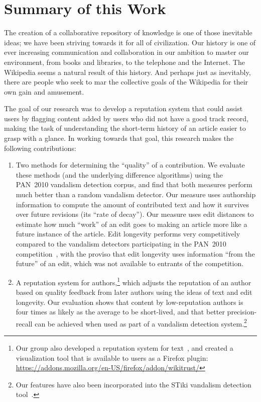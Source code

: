 \section{Summary of this Work}

The creation of a collaborative repository of knowledge is
one of those inevitable ideas; we have been striving towards it
for all of civilization.
Our history is one of ever increasing communication and collaboration
in our ambition to master our environment, from books and libraries,
to the telephone and the Internet.
The Wikipedia seems a natural result of this history.
And perhaps just as inevitably, there are people who seek to
mar the collective goals of the Wikipedia for their own gain and amusement.

The goal of our research was to develop a reputation system
that could assist users by flagging content added by users who
did not have a good track record, making the task of understanding
the short-term history of an article easier to grasp with a glance.
In working towards that goal, this research makes the following contributions:
\begin{enumerate}

\item Two methods for determining the ``quality'' of a contribution.
  We evaluate these methods (and the underlying difference algorithms)
  using the PAN~2010 vandalism detection corpus, and find that both
  measures perform much better than a random vandalism detector.
  Our  measure uses authorship information to
  compute the amount of contributed text and how it survives over
  future revisions (its ``rate of decay'').
  Our  measure uses edit distances to estimate
  how much ``work'' of an edit goes to making an article more like a
  future instance of the article.
  Edit longevity performs very competitively
  compared to the vandalism detectors participating in the
  PAN~2010 competition~\cite{Potthast2010b}, with the proviso that
  edit longevity uses information ``from the future'' of an edit,
  which was not available to entrants of the competition.

\item A reputation system for authors,\footnote{Our group also
  developed a reputation system for text~\cite{Adler2008b},
  and created a visualization
  tool that is available to users as a Firefox plugin: \\
  \url{https://addons.mozilla.org/en-US/firefox/addon/wikitrust/}}
  which adjusts the reputation of an author based on quality feedback
  from later authors using the ideas of text and edit longevity.
  Our evaluation shows that content by low-reputation authors is
  four times as likely as the average to be short-lived, and that better
  precision-recall can be achieved when used as part of a vandalism
  detection system.\footnote{Our features have also been incorporated
  into the STiki vandalism detection tool~\cite{wiki:STiki}.}

\end{enumerate}


